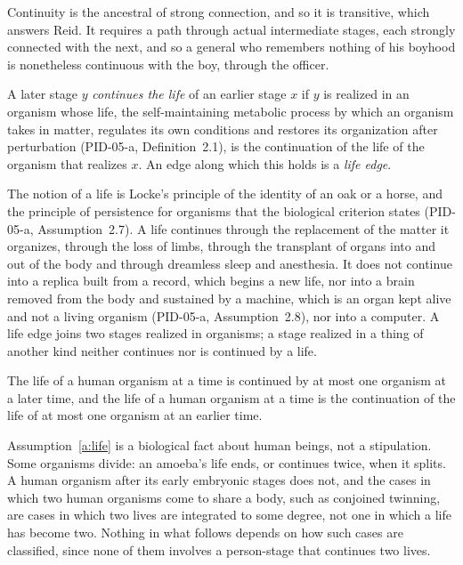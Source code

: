\documentclass{situationist-preprint}
\begin{document}
Continuity is the ancestral of strong connection, and so it is transitive, which answers Reid. It requires a path through actual intermediate stages, each strongly connected with the next, and so a general who remembers nothing of his boyhood is nonetheless continuous with the boy, through the officer.

\begin{definition}[Life]\label{d:life}
A later stage $y$ \emph{continues the life} of an earlier stage $x$ if $y$ is realized in an organism whose life, the self-maintaining metabolic process by which an organism takes in matter, regulates its own conditions and restores its organization after perturbation (PID-05-a, Definition~2.1), is the continuation of the life of the organism that realizes $x$. An edge along which this holds is a \emph{life edge}.
\end{definition}

The notion of a life is Locke's principle of the identity of an oak or a horse, and the principle of persistence for organisms that the biological criterion states (PID-05-a, Assumption~2.7). A life continues through the replacement of the matter it organizes, through the loss of limbs, through the transplant of organs into and out of the body and through dreamless sleep and anesthesia. It does not continue into a replica built from a record, which begins a new life, nor into a brain removed from the body and sustained by a machine, which is an organ kept alive and not a living organism (PID-05-a, Assumption~2.8), nor into a computer. A life edge joins two stages realized in organisms; a stage realized in a thing of another kind neither continues nor is continued by a life.

\begin{assumption}\label{a:life}
The life of a human organism at a time is continued by at most one organism at a later time, and the life of a human organism at a time is the continuation of the life of at most one organism at an earlier time.
\end{assumption}

Assumption~\ref{a:life} is a biological fact about human beings, not a stipulation. Some organisms divide: an amoeba's life ends, or continues twice, when it splits. A human organism after its early embryonic stages does not, and the cases in which two human organisms come to share a body, such as conjoined twinning, are cases in which two lives are integrated to some degree, not one in which a life has become two. Nothing in what follows depends on how such cases are classified, since none of them involves a person-stage that continues two lives.
\end{document}
